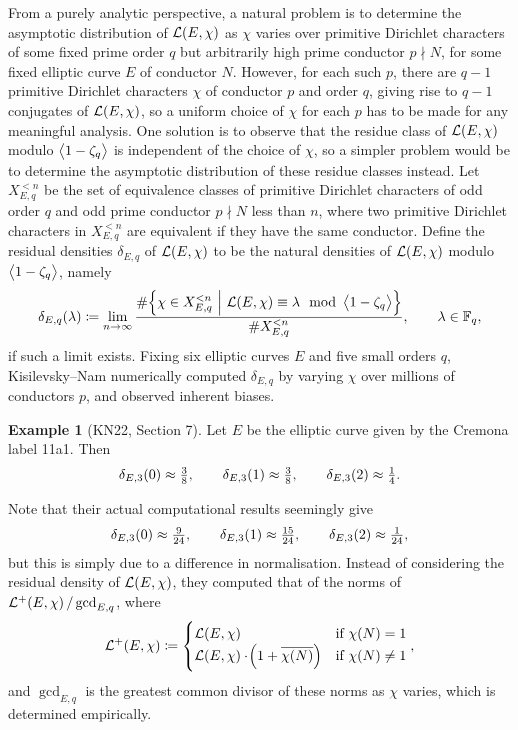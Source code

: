 \documentclass{article}
\theoremstyle{plain}
\theoremstyle{definition}
\newtheorem*{example}{Example}
\newcommand{\FF}{\mathbb{F}}
\newcommand{\LLL}{\mathcal{L}}
\newcommand{\abr}[2][-1]{\ensuremath{\mathinner{\ifthenelse{\equal{#1}{-1}}{\left\langle#2\right\rangle}{}\ifthenelse{\equal{#1}{1}}{\bigl\langle#2\bigr\rangle}{}}}}
\newcommand{\br}{\!\del}
\newcommand{\st}{\ \middle| \ }
\begin{document}
From a purely analytic perspective, a natural problem is to determine the asymptotic distribution of $ \LLL\br{E, \chi} $ as $ \chi $ varies over primitive Dirichlet characters of some fixed prime order $ q $ but arbitrarily high prime conductor $ p \nmid N $, for some fixed elliptic curve $ E $ of conductor $ N $. However, for each such $ p $, there are $ q - 1 $ primitive Dirichlet characters $ \chi $ of conductor $ p $ and order $ q $, giving rise to $ q - 1 $ conjugates of $ \LLL\br{E, \chi} $, so a uniform choice of $ \chi $ for each $ p $ has to be made for any meaningful analysis. One solution is to observe that the residue class of $ \LLL\br{E, \chi} $ modulo $ \abr{1 - \zeta_q} $ is independent of the choice of $ \chi $, so a simpler problem would be to determine the asymptotic distribution of these residue classes instead. Let $ X_{E, q}^{< n} $ be the set of equivalence classes of primitive Dirichlet characters of odd order $ q $ and odd prime conductor $ p \nmid N $ less than $ n $, where two primitive Dirichlet characters in $ X_{E, q}^{< n} $ are equivalent if they have the same conductor. Define the residual densities $ \delta_{E, q} $ of $ \LLL\br{E, \chi} $ to be the natural densities of $ \LLL\br{E, \chi} $ modulo $ \abr{1 - \zeta_q} $, namely
$$ \delta_{E, q}\br{\lambda} \coloneqq \lim_{n \to \infty} \dfrac{\#\cbr{\chi \in X_{E, q}^{< n} \st \LLL\br{E, \chi} \equiv \lambda \mod \abr{1 - \zeta_q}}}{\#X_{E, q}^{< n}}, \qquad \lambda \in \FF_q, $$
if such a limit exists. Fixing six elliptic curves $ E $ and five small orders $ q $, Kisilevsky--Nam numerically computed $ \delta_{E, q} $ by varying $ \chi $ over millions of conductors $ p $, and observed inherent biases.

\begin{example}[KN22, Section 7]
Let $ E $ be the elliptic curve given by the Cremona label 11a1. Then
$$ \delta_{E, 3}\br{0} \approx \tfrac{3}{8}, \qquad \delta_{E, 3}\br{1} \approx \tfrac{3}{8}, \qquad \delta_{E, 3}\br{2} \approx \tfrac{1}{4}. $$
\end{example}

Note that their actual computational results seemingly give
$$ \delta_{E, 3}\br{0} \approx \tfrac{9}{24}, \qquad \delta_{E, 3}\br{1} \approx \tfrac{15}{24}, \qquad \delta_{E, 3}\br{2} \approx \tfrac{1}{24}, $$
but this is simply due to a difference in normalisation. Instead of considering the residual density of $ \LLL\br{E, \chi} $, they computed that of the norms of $ \LLL^+\br{E, \chi} / \gcd_{E, q} $, where
$$ \LLL^+\br{E, \chi} \coloneqq
\begin{cases}
\LLL\br{E, \chi} & \text{if} \ \chi\br{N} = 1 \\
\LLL\br{E, \chi} \cdot \br{1 + \overline{\chi\br{N}}} & \text{if} \ \chi\br{N} \ne 1
\end{cases},
$$
and $ \gcd_{E, q} $ is the greatest common divisor of these norms as $ \chi $ varies, which is determined empirically.
\end{document}
